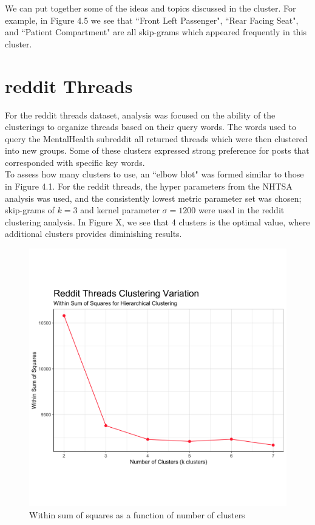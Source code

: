 We can put together some of the ideas and topics discussed in the cluster. For example, in Figure 4.5 we see that ``Front Left Passenger", ``Rear Facing Seat", and ``Patient Compartment" are all skip-grams which appeared frequently in this cluster.\\


\section{reddit Threads}

For the reddit threads dataset, analysis was focused on the ability of the clusterings to organize threads based on their query words. The words used to query the MentalHealth subreddit all returned threads which were then clustered into new groups. Some of these clusters expressed strong preference for posts that corresponded with specific key words. \\
To assess how many clusters to use, an ``elbow blot" was formed similar to those in Figure 4.1. For the reddit threads, the hyper parameters from the NHTSA analysis was used, and the consistently lowest metric parameter set was chosen; skip-grams of $k=3$ and kernel parameter $\sigma = 1200$ were used in the reddit clustering analysis. In Figure X, we see that 4 clusters is the optimal value, where additional clusters provides diminishing results. \\

\begin{figure}
\includegraphics[width=6in]{Content/Images/reddit_wss.png}
\caption{Within sum of squares as a function of number of clusters}
\end{figure}

